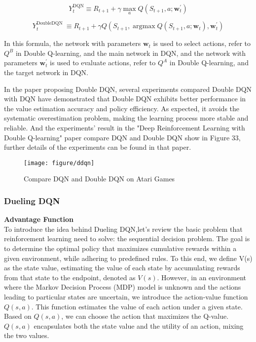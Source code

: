 \documentclass{article}
\begin{document}
\begin{equation}
Y_t^{\mathrm{DQN}} \equiv R_{t+1}+\gamma \max _a Q\left(S_{t+1}, a ; \boldsymbol{w}_t^{'}\right)
\end{equation}

\begin{equation}
Y_t^{\text {DoubleDQN }} \equiv R_{t+1}+\gamma Q\left(S_{t+1}, \operatorname{argmax} Q\left(S_{t+1}, a ; \boldsymbol{w}_t\right), \boldsymbol{w}_t^{'}\right)
\end{equation}

In this formula, the network with parameters $\boldsymbol{w}_t$ is used to select actions, refer to $Q^B$ in Double Q-learning, and the main network in DQN, and the network with parameters $\boldsymbol{w}_t^{'}$ is used to evaluate actions, refer to $Q^A$ in Double Q-learning, and the target network in DQN. 
 

In the paper proposing Double DQN, several experiments compared Double DQN with DQN have demonstrated that Double DQN exhibits better performance in the value estimation accuracy and policy efficiency. As expected, it avoids the systematic overestimation problem, making the learning process more stable and reliable. And the experiments' result in the "Deep Reinforcement Learning with Double Q-learning" paper compare DQN and Double DQN show in Figure 33, further details of the experiments can be found in that paper.

\begin{figure}[htbp]
        \centering
        \texttt{[image: figure/ddqn]}
        \caption{Compare DQN and Double DQN on Atari Games}
     \end{figure}

\newpage
\subsubsection{Dueling DQN}

\noindent
\textbf{Advantage Function}\\
\noindent
To introduce the idea behind Dueling DQN,let's review the basic problem that reinforcement learning need to solve: the sequential decision problem. The goal is to determine the optimal policy that maximizes cumulative rewards within a given environment, while adhering to predefined rules. To this end, we define V(s) as the state value, estimating the value of each state by accumulating rewards from that state to the endpoint, denoted as $V(s)$. However, in an environment where the Markov Decision Process (MDP) model is unknown and the actions leading to particular states are uncertain, we introduce the action-value function $Q(s,a)$. This function estimates the value of each action under a given state. Based on $Q(s,a)$, we can choose the action that maximizes the Q-value. $Q(s,a)$ encapsulates both the state value and the utility of an action, mixing the two values.
\end{document}

